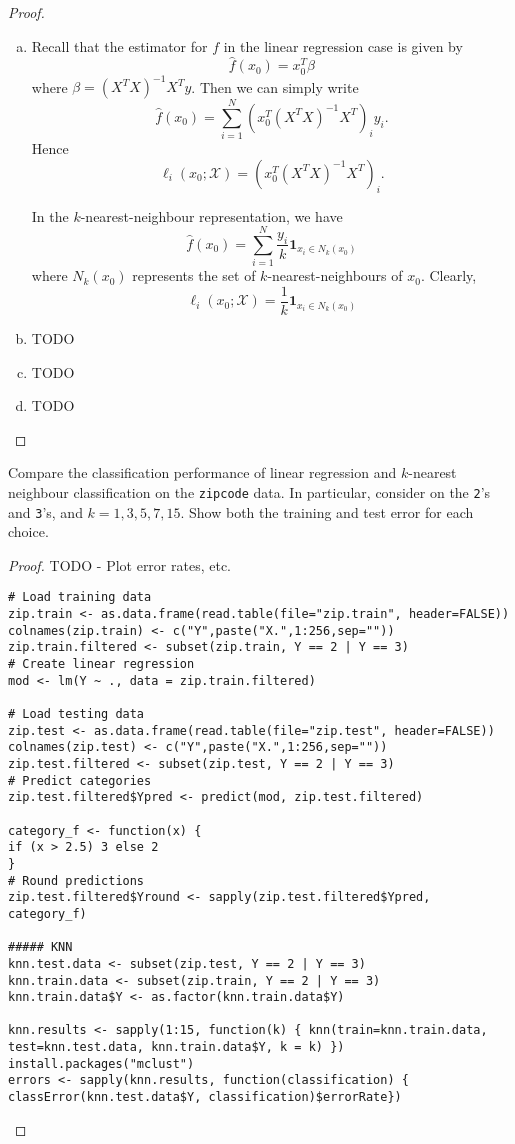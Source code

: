\begin{proof}
    \begin{enumerate}[(a)]
        \item Recall that the estimator for $f$ in the linear regression case is given by \[
            \hat f(x_0) = x_0^T \beta 
        \] where $\beta = (X^T X)^{-1} X^T y$.  Then we can simply write \[
            \hat f(x_0) = \sum_{i=1}^N \left( x_0^T (X^T X)^{-1} X^T \right)_i y_i.
        \]  Hence \[
            \ell_i(x_0; \mathcal X) = \left( x_0^T (X^T X)^{-1} X^T \right)_i.
        \]
        
        In the $k$-nearest-neighbour representation, we have \[
            \hat f(x_0) = \sum_{i=1}^N \frac{y_i}{k} \mathbf{1}_{x_i \in N_k(x_0)}
        \] where $N_k(x_0)$ represents the set of $k$-nearest-neighbours of $x_0$.  Clearly, \[
            \ell_i(x_0; \mathcal X) = \frac{1}{k} \mathbf{1}_{x_i \in N_k(x_0)}
        \]
        \item TODO
        \item TODO
        \item TODO
    \end{enumerate}
\end{proof}

\begin{exer}
    Compare the classification performance of linear regression and $k$-nearest neighbour classification on the \texttt{zipcode} data.  In particular, consider on the \texttt{2}'s and \texttt{3}'s, and $k = 1, 3, 5, 7, 15$.  Show both the training and test error for each choice.
\end{exer}

\begin{proof}
    TODO - Plot error rates, etc.
    
\begin{lstlisting}
# Load training data
zip.train <- as.data.frame(read.table(file="zip.train", header=FALSE))
colnames(zip.train) <- c("Y",paste("X.",1:256,sep=""))
zip.train.filtered <- subset(zip.train, Y == 2 | Y == 3)
# Create linear regression
mod <- lm(Y ~ ., data = zip.train.filtered)

# Load testing data
zip.test <- as.data.frame(read.table(file="zip.test", header=FALSE))
colnames(zip.test) <- c("Y",paste("X.",1:256,sep=""))
zip.test.filtered <- subset(zip.test, Y == 2 | Y == 3)
# Predict categories
zip.test.filtered$Ypred <- predict(mod, zip.test.filtered)

category_f <- function(x) {
if (x > 2.5) 3 else 2
}
# Round predictions
zip.test.filtered$Yround <- sapply(zip.test.filtered$Ypred, category_f)

##### KNN
knn.test.data <- subset(zip.test, Y == 2 | Y == 3)
knn.train.data <- subset(zip.train, Y == 2 | Y == 3)
knn.train.data$Y <- as.factor(knn.train.data$Y)

knn.results <- sapply(1:15, function(k) { knn(train=knn.train.data, test=knn.test.data, knn.train.data$Y, k = k) })
install.packages("mclust")
errors <- sapply(knn.results, function(classification) { classError(knn.test.data$Y, classification)$errorRate})
\end{lstlisting}
    
\end{proof}

